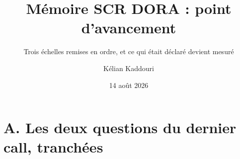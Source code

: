 \documentclass[11pt]{beamer}
\title[Point d'avancement]{Mémoire SCR DORA : point d'avancement}
\subtitle{Trois échelles remises en ordre, et ce qui était déclaré devient mesuré}
\author[K. Kaddouri]{Kélian Kaddouri}
\institute[ENSAE / Nexialog]{ENSAE / Nexialog Consulting}
\date[14/08/2026]{14 août 2026}
\begin{document}

\begin{frame}
\titlepage
\end{frame}

\section*{A. Les deux questions du dernier call, tranchées}

%
\end{document}
